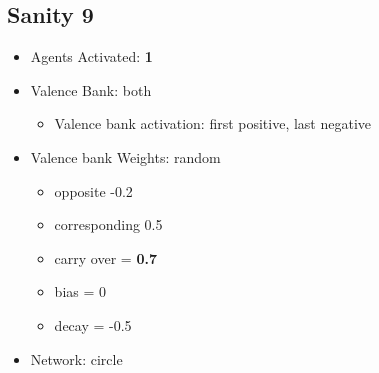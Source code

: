 \documentclass{article}\usepackage[]{graphicx}\usepackage[]{color}
\begin{document}
\subsection{Sanity 9}
\label{sec:sanity9}
\begin{itemize}
  \item Agents Activated: \textbf{1}
  \item Valence Bank: both
  \begin{itemize}
      \item Valence bank activation: first positive, last negative
  \end{itemize}
  \item Valence bank Weights: random
  \begin{itemize}
      \item opposite -0.2
      \item corresponding 0.5
      \item carry over = \textbf{0.7}
      \item bias = 0
      \item decay = -0.5
  \end{itemize}
  \item Network: circle
\end{itemize}
\end{document}

